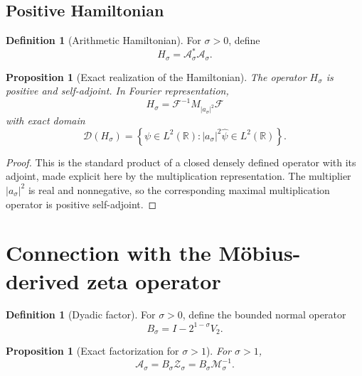 \documentclass[11pt]{amsart}
\numberwithin{equation}{section}
\theoremstyle{plain}
\newtheorem{proposition}[theorem]{Proposition}
\theoremstyle{definition}
\newtheorem{definition}[theorem]{Definition}
\theoremstyle{remark}
\newcommand{\R}{\mathbb{R}}
\newcommand{\Four}{\mathcal{F}}
\newcommand{\Dom}{\mathcal{D}}
\begin{document}
\subsection{Positive Hamiltonian}
\label{subsec:positive_hamiltonian}

\begin{definition}[Arithmetic Hamiltonian]
\label{def:arithmetic_hamiltonian}
For $\sigma>0$, define
\begin{equation}
H_\sigma
=\mathcal A_\sigma^*\mathcal A_\sigma.
\label{eq:H_sigma_definition}
\end{equation}
\end{definition}

\begin{proposition}[Exact realization of the Hamiltonian]
\label{prop:H_sigma_realization}
The operator $H_\sigma$ is positive and self-adjoint.  In Fourier
representation,
\begin{equation}
H_\sigma
=\Four^{-1}M_{|a_\sigma|^2}\Four
\label{eq:H_sigma_multiplier}
\end{equation}
with exact domain
\begin{equation}
\Dom(H_\sigma)
=\left\{
\psi\in L^2(\R):
|a_\sigma|^2\widehat\psi\in L^2(\R)
\right\}.
\label{eq:H_sigma_domain}
\end{equation}
\end{proposition}

\begin{proof}
This is the standard product of a closed densely defined operator with its
adjoint, made explicit here by the multiplication representation.  The
multiplier $|a_\sigma|^2$ is real and nonnegative, so the corresponding
maximal multiplication operator is positive self-adjoint.
\end{proof}

\section{Connection with the M\"obius-derived zeta operator}
\label{sec:eta_zeta_connection}

\begin{definition}[Dyadic factor]
\label{def:dyadic_factor}
For $\sigma>0$, define the bounded normal operator
\begin{equation}
B_\sigma
=I-2^{1-\sigma}V_2.
\label{eq:B_sigma_definition}
\end{equation}
\end{definition}

\begin{proposition}[Exact factorization for $\sigma>1$]
\label{prop:eta_zeta_factorization}
For $\sigma>1$,
\begin{equation}
\mathcal A_\sigma
=B_\sigma\mathcal Z_\sigma
=B_\sigma\mathcal M_\sigma^{-1}.
\label{eq:eta_zeta_operator_factorization}
\end{equation}
\end{proposition}
\end{document}

